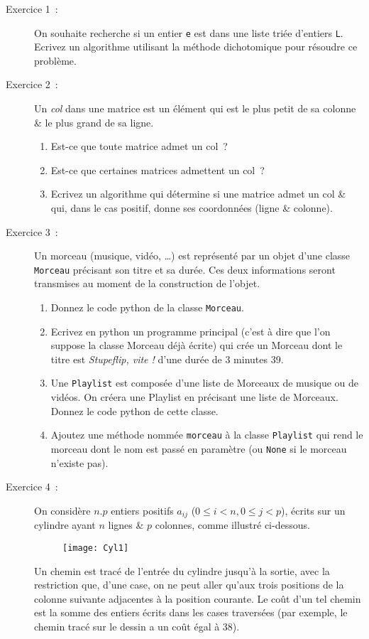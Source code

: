 \documentclass
[12pt]
{article}
\begin{document}
\begin{description}
\item[Exercice 1~:] On souhaite recherche si un entier \texttt{e} est dans une liste triée d'entiers \texttt{L}. Ecrivez un algorithme utilisant la méthode dichotomique pour résoudre ce problème. \\


%
\item[Exercice 2~:] Un {\it col} dans une matrice est un élément qui est le plus petit de sa colonne \& le plus grand de sa ligne.
\begin{enumerate}
\item Est-ce que toute matrice admet un col~?
\item Est-ce que certaines matrices admettent un col~?
\item Ecrivez un algorithme qui détermine si une matrice admet un col \& qui, dans le cas positif, donne ses coordonnées (ligne \& colonne).\\
\end{enumerate}

%
%

\item[Exercice 3~:] Un morceau (musique, vidéo, \dots) est représenté par un objet d’une classe \texttt{Morceau} précisant son titre et sa durée. Ces deux informations seront transmises au moment de la construction de l’objet.
\begin{enumerate}
    \item  Donnez le code python de la classe \texttt{Morceau}.
    \item Ecrivez en python un programme principal (c’est à dire que l’on suppose la classe Morceau déjà écrite) qui crée un Morceau dont le titre est {\it Stupeflip, vite !} d’une durée de 3 minutes 39.
    \item Une \texttt{Playlist} est composée d’une liste de Morceaux de musique ou de vidéos. On créera une
Playlist en précisant une liste de Morceaux. Donnez le code python de cette classe.
    \item Ajoutez une méthode nommée \texttt{morceau} à la classe \texttt{Playlist} qui rend le morceau dont le nom est passé en paramètre (ou \texttt{None} si le morceau n'existe pas).
\end{enumerate}

\item[Exercice 4~:] On considère $n.p$ entiers positifs $a_{ij}$ ($0\leq i< n, 0\leq
j< p$), écrits sur un cylindre ayant $n$ lignes \& $p$ colonnes,
comme illustré ci-dessous.%
%
\begin{figure}[h!]
\begin{center}
\texttt{[image: Cyl1]}
\end{center}
\end{figure}
Un chemin est tracé de l'entrée du cylindre jusqu'à la sortie, avec la
restriction que, d'une case, on ne peut aller qu'aux trois positions
de la colonne suivante adjacentes à la position courante. Le coût d'un
tel chemin est la somme des entiers écrits dans les cases traversées
(par exemple, le chemin tracé sur le dessin a un coût égal à 38).


\end{description}
\end{document}
